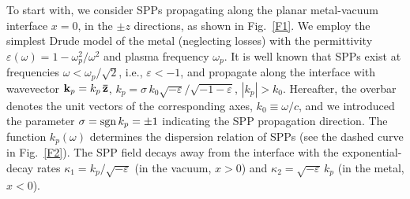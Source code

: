 \documentclass[9pt,twocolumn,twoside]{osajnl}
\begin{document}
To start with, we consider SPPs propagating along the planar metal-vacuum interface $x=0$, in the $\pm z$ directions, as shown in Fig.~\ref{F1}. We employ the simplest Drude model of the metal (neglecting losses) with the permittivity 
$\varepsilon \left( \omega  \right) = 1 - \omega _p^2/{\omega ^2}$ and plasma frequency $\omega_p$. It is well known \cite{Zayats,Maier} that SPPs exist at frequencies $\omega  < {\omega _p}/\sqrt 2$, i.e., $\varepsilon < -1$, and propagate along the interface with wavevector ${{\bf{k}}_p} = {k_p}\,{\bf{\bar z}}$, ${k_p} = \sigma\, {k_0}\sqrt { - \varepsilon } /\sqrt { - 1 - \varepsilon }$, $\left| {{k_p}} \right| > {k_0}$. Hereafter, the overbar denotes the unit vectors of the corresponding axes, ${k_0} \equiv \omega /c$, and we introduced the parameter $\sigma  = {\rm sgn}\, {k_p} =  \pm 1$ indicating the SPP propagation direction. The function ${k_p}\!\left( \omega  \right)$ determines the dispersion relation of SPPs (see the dashed curve in Fig.~\ref{F2}). The SPP field decays away from the interface with the exponential-decay rates ${\kappa _1} = {k_p}/\sqrt { - \varepsilon }$ (in the vacuum, $x>0$) and ${\kappa _2} = \sqrt { - \varepsilon }\, {k_p}$ (in the metal, $x<0$).
\end{document}
